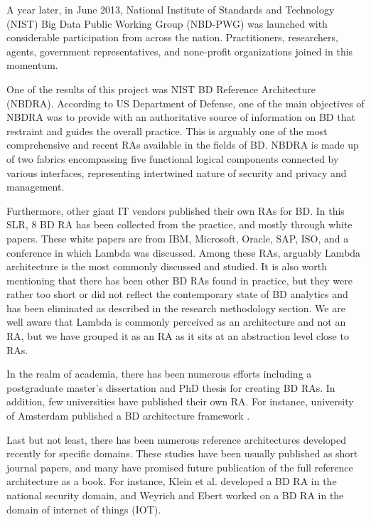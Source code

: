 \documentclass{ieeeaccess}
\begin{document}
A year later, in June 2013, National Institute of Standards and Technology (NIST) Big Data Public Working Group (NBD-PWG) was launched with considerable participation from across the nation. Practitioners, researchers, agents, government representatives, and none-profit organizations joined in this momentum.

One of the results of this project was NIST BD Reference Architecture (NBDRA). According to US Department of Defense, one of the main objectives of NBDRA was to provide with an authoritative source of information on BD that restraint and guides the overall practice. This is arguably one of the most comprehensive and recent RAs available in the fields of BD. NBDRA is made up of two fabrics encompassing five functional logical components connected by various interfaces, representing intertwined nature of security and privacy and management.

Furthermore, other giant IT vendors published their own RAs for BD. In this SLR, 8 BD RA has been collected from the practice, and mostly through white papers. These white papers are from IBM, Microsoft, Oracle, SAP, ISO, and a conference in which Lambda was discussed. Among these RAs, arguably Lambda architecture is the most commonly discussed and studied. It is also worth mentioning that there has been other BD RAs found in practice, but they were rather too short or did not reflect the contemporary state of BD analytics and has been eliminated as described in the research methodology section. We are well aware that Lambda is commonly perceived as an architecture and not an RA, but we have grouped it as an RA as it sits at an abstraction level close to RAs.

In the realm of academia, there has been numerous efforts including a postgraduate master’s dissertation \cite{Maier} and PhD thesis \cite{suthakar2017scalable} for creating BD RAs. In addition, few universities have published their own RA. For instance, university of Amsterdam published a BD architecture framework \cite{framework2015draft}. 

Last but not least, there has been numerous reference architectures developed recently for specific domains. These studies have been usually published as short journal papers, and many have promised future publication of the full reference architecture as a book. For instance, Klein et al. \cite{Klein} developed a BD RA in the national security domain, and Weyrich and Ebert \cite{weyrich2015reference} worked on a BD RA in the domain of internet of things (IOT). 
\end{document}
